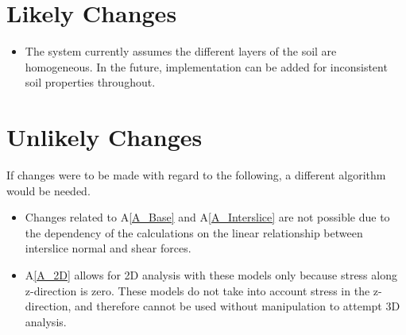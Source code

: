 \documentclass[12pt]{article}
\newcommand{\aref}[1]{A\ref{#1}}
\newcounter{lcnum} %
\newcommand{\lthelcnum}{LC\thelcnum}
\newcounter{ucnum} %
\newcommand{\ltheucnum}{UC\theucnum}
\begin{document}
\section{Likely Changes}

\noindent \begin{itemize}
\item[\refstepcounter{lcnum}\lthelcnum \label{LC_inhomogeneous}:] The system currently assumes the different layers of the soil are homogeneous.
 In the future, implementation can be added for inconsistent soil properties throughout.
\end{itemize}

\section{Unlikely Changes}
If changes were to be made with regard to the following,
a different algorithm would be needed.

\begin{itemize}
\item[\refstepcounter{ucnum}\ltheucnum \label{UC_insf}:] Changes related to \aref{A_Base} and \aref{A_Interslice} are not possible
 due to the dependency of the calculations on the linear relationship between interslice normal and shear forces.
\item[\refstepcounter{ucnum}\ltheucnum \label{UC_inhomogeneous}:] \aref{A_2D} allows for 2D analysis with these models only because stress along z-direction is zero. 
These models do not take into account stress in the z-direction, and therefore cannot be used without manipulation to attempt 3D analysis.
\end{itemize}
\end{document}
